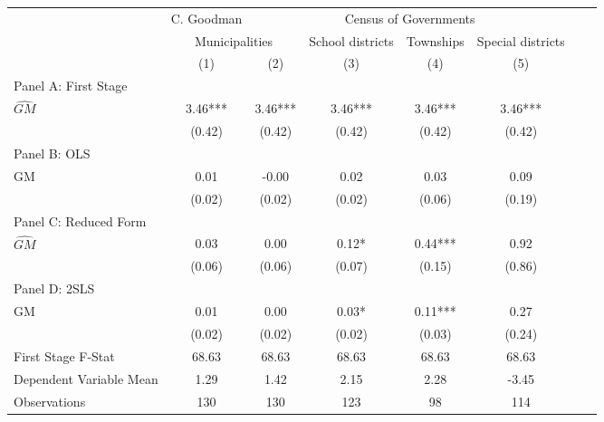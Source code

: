  \begin{tabular}{l*{7}{c}} \toprule
&\multicolumn{1}{c}{C. Goodman}&\multicolumn{4}{c}{Census of Governments}\\\cmidrule(lr){2-2}\cmidrule(lr){3-6}
&\multicolumn{2}{c}{Municipalities}&\multicolumn{1}{c}{School districts}&\multicolumn{1}{c}{Townships}&\multicolumn{1}{c}{Special districts}\\\cmidrule(lr){2-3}\cmidrule(lr){4-6}
&\multicolumn{1}{c}{(1)}&\multicolumn{1}{c}{(2)}&\multicolumn{1}{c}{(3)}&\multicolumn{1}{c}{(4)}&\multicolumn{1}{c}{(5)}\\
\cmidrule(lr){1-6}
\multicolumn{5}{l}{Panel A: First Stage}\\
\cmidrule(lr){1-6}
$\widehat{GM}$  &     3.46***&     3.46***&     3.46***&     3.46***&     3.46***\\
                &   (0.42)   &   (0.42)   &   (0.42)   &   (0.42)   &   (0.42)   \\
\cmidrule(lr){1-6}
\multicolumn{5}{l}{Panel B: OLS}\\
\cmidrule(lr){1-6}
GM              &     0.01   &    -0.00   &     0.02   &     0.03   &     0.09   \\
                &   (0.02)   &   (0.02)   &   (0.02)   &   (0.06)   &   (0.19)   \\
\cmidrule(lr){1-6}
\multicolumn{5}{l}{Panel C: Reduced Form}\\
\cmidrule(lr){1-6}
$\widehat{GM}$  &     0.03   &     0.00   &     0.12*  &     0.44***&     0.92   \\
                &   (0.06)   &   (0.06)   &   (0.07)   &   (0.15)   &   (0.86)   \\
\cmidrule(lr){1-6}
\multicolumn{5}{l}{Panel D: 2SLS}\\
\cmidrule(lr){1-6}
GM              &     0.01   &     0.00   &     0.03*  &     0.11***&     0.27   \\
                &   (0.02)   &   (0.02)   &   (0.02)   &   (0.03)   &   (0.24)   \\
\midrule
First Stage F-Stat&    68.63   &    68.63   &    68.63   &    68.63   &    68.63   \\
Dependent Variable Mean&     1.29   &     1.42   &     2.15   &     2.28   &    -3.45   \\
Observations    &      130   &      130   &      123   &       98   &      114   \\
       \bottomrule \end{tabular}
